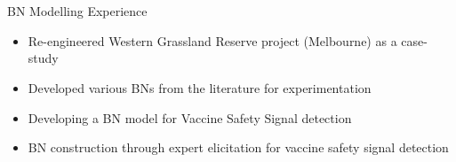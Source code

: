 \section{\faBuilding}{BN Modelling Experience}
\begin{itemize}[noitemsep]
    \item Re-engineered Western Grassland Reserve project (Melbourne) as a case-study
    \item Developed various BNs from the literature for experimentation
    \item Developing a BN model for Vaccine Safety Signal detection
    \item BN construction through expert elicitation for vaccine safety signal detection
\end{itemize}